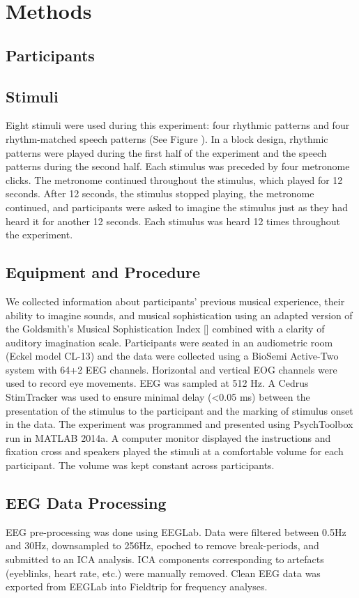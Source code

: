 \section*{Methods}
\subsection*{Participants}
\subsection*{Stimuli}
Eight stimuli were used during this experiment: four rhythmic patterns and four rhythm-matched speech patterns (See Figure  ). 
In a block design, rhythmic patterns were played during the first half of the experiment and the speech patterns during the second half. 
Each stimulus was preceded by four metronome clicks.
The metronome continued throughout the stimulus, which played for 12 seconds. 
After 12 seconds, the stimulus stopped playing, the metronome continued, and participants were asked to imagine the stimulus just as they had heard it for another 12 seconds. 
Each stimulus was heard 12 times throughout the experiment. 
\subsection*{Equipment and Procedure}
We collected information about participants' previous musical experience, their ability to imagine sounds, and musical sophistication using an adapted version of the Goldsmith's Musical Sophistication Index [] combined with a clarity of auditory imagination scale. 
Participants were seated in an audiometric room (Eckel model CL-13) and the data were collected using a BioSemi Active-Two system with 64+2 EEG channels. 
Horizontal and vertical EOG channels were used to record eye movements. EEG was sampled at 512 Hz. A Cedrus StimTracker was used to ensure minimal delay (<0.05 ms) between the presentation of the stimulus to the participant and the marking of stimulus onset in the data. 
The experiment was programmed and presented using PsychToolbox run in MATLAB 2014a. A computer monitor displayed the instructions and fixation cross and speakers played the stimuli at a comfortable volume for each participant. 
The volume was kept constant across participants.
\subsection*{EEG Data Processing}
EEG pre-processing was done using EEGLab. 
Data were filtered between 0.5Hz and 30Hz, downsampled to 256Hz, epoched to remove break-periods, and submitted to an ICA analysis.
ICA components corresponding to artefacts (eyeblinks, heart rate, etc.) were manually removed.
Clean EEG data was exported from EEGLab into Fieldtrip for frequency analyses.